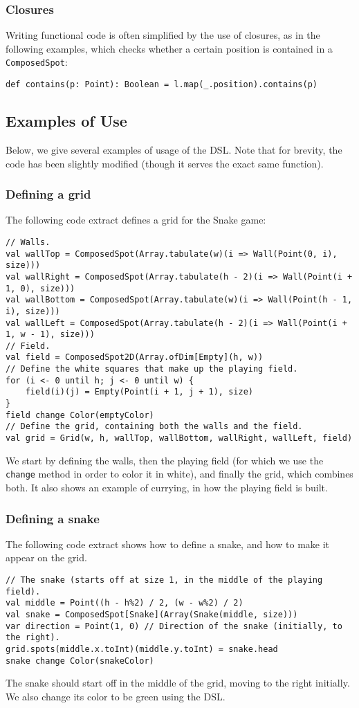 \documentclass[journal,onecolumn]{IEEEtran}
\theoremstyle{definition}
\newcommand{\scala}[1]{\texttt{#1}}
\begin{document}
\subsubsection{Closures}
Writing functional code is often simplified by the use of closures, as in the following examples, which checks whether a certain position is contained in a \scala{ComposedSpot}:
\begin{verbatim}
def contains(p: Point): Boolean = l.map(_.position).contains(p)
\end{verbatim}

\subsection{Examples of Use}
Below, we give several examples of usage of the DSL.
Note that for brevity, the code has been slightly modified (though it serves the exact same function).

\subsubsection{Defining a grid}
The following code extract defines a grid for the Snake game:%
\begin{verbatim}
// Walls.
val wallTop = ComposedSpot(Array.tabulate(w)(i => Wall(Point(0, i), size)))
val wallRight = ComposedSpot(Array.tabulate(h - 2)(i => Wall(Point(i + 1, 0), size)))
val wallBottom = ComposedSpot(Array.tabulate(w)(i => Wall(Point(h - 1, i), size)))
val wallLeft = ComposedSpot(Array.tabulate(h - 2)(i => Wall(Point(i + 1, w - 1), size)))
// Field.
val field = ComposedSpot2D(Array.ofDim[Empty](h, w))
// Define the white squares that make up the playing field.
for (i <- 0 until h; j <- 0 until w) {
	field(i)(j) = Empty(Point(i + 1, j + 1), size)
}
field change Color(emptyColor)
// Define the grid, containing both the walls and the field.
val grid = Grid(w, h, wallTop, wallBottom, wallRight, wallLeft, field)
\end{verbatim}
We start by defining the walls, then the playing field (for which we use the \scala{change} method in order to color it in white), and finally the grid, which combines both.
It also shows an example of currying, in how the playing field is built.

\subsubsection{Defining a snake}
The following code extract shows how to define a snake, and how to make it appear on the grid. %
\begin{verbatim}
// The snake (starts off at size 1, in the middle of the playing field).
val middle = Point((h - h%2) / 2, (w - w%2) / 2)
val snake = ComposedSpot[Snake](Array(Snake(middle, size)))
var direction = Point(1, 0) // Direction of the snake (initially, to the right).
grid.spots(middle.x.toInt)(middle.y.toInt) = snake.head
snake change Color(snakeColor)
\end{verbatim}
The snake should start off in the middle of the grid, moving to the right initially.
We also change its color to be green using the DSL.
\end{document}

